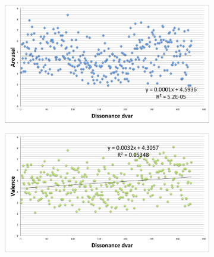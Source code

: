\begin{figure}
	    \centering
        \begin{subfigure}[b]{0.48\textwidth}
                \includegraphics[width=\textwidth]{Figures/dissonancedvar-arousal}
			   \vspace{20pt}
        \end{subfigure}
        \begin{subfigure}[b]{0.48\textwidth}
                \includegraphics[width=\textwidth]{Figures/dissonancedvar-valence}
                  \vspace{20pt}
        \end{subfigure}        
        
\end{figure}